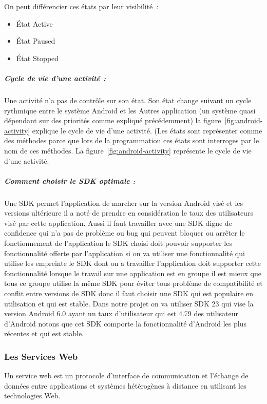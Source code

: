 On peut différencier ces états par leur visibilité :
\begin{itemize}
 \item État Active
 \item État Paused
 \item État Stopped
\end{itemize}

\subparagraph{Cycle de vie d'une activité :}

Une activité n'a pas de contrôle sur son état.
Son état change suivant un cycle rythmique entre le système Android et les
Autres application (un système quasi dépendant sur des priorités comme expliqué
précédemment) la figure~\ref{fig:android-activity} explique le cycle de vie
d'une activité. (Les états sont représenter comme des méthodes parce que lors de
la programmation ces états sont interroges par le nom de ces méthodes.
La figure~\ref{fig:android-activity} représente le cycle de vie d'une activité.



\subparagraph{Comment choisir le SDK optimale :}

Une SDK permet l'application de marcher sur la version Android visé
et les versions ultérieure il  a noté de prendre en considération le taux des
utilisateurs visé par cette application. Aussi il faut travailler avec une SDK
digne de confidence qui n'a pas de problème ou bug qui peuvent  bloquer ou arrêter
le fonctionnement de l'application le SDK choisi doit pouvoir supporter les
fonctionnalité offerte par l'application si on va utiliser une fonctionnalité
qui utilise les empreinte le SDK dont on a travailler l'application doit supporter
cette fonctionnalité lorsque le travail sur une application est en groupe il est
mieux que tous ce groupe utilise la même SDK pour éviter tous problème de
compatibilité et conflit entre versions de SDK  donc il faut choisir une SDK
qui est populaire en utilisation et qui est stable. Dans notre projet on va
utiliser SDK 23 qui vise la version Android 6.0 ayant un taux d'utilisateur
qui est 4.79 %
des utilisateur d'Android notons que cet SDK comporte
la fonctionnalité d'Android les plus récentes et qui est stable.

\subsubsection{Les Services Web}

Un service web est un protocole d'interface de communication et l'échange de
données entre applications et systèmes hétérogènes à distance en utilisant les
technologies Web.

